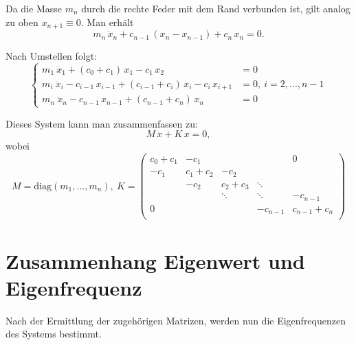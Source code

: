 \documentclass[ngerman,BCOR=4mm]{tudscrreprt}
\theoremstyle{plain} %
\theoremstyle{definition} %
\theoremstyle{remark}
\begin{document}
            Da die Masse $m_n$ durch die rechte Feder mit dem Rand verbunden ist, gilt analog zu oben $x_{n+1} \equiv 0$.
            Man erhält
            $$m_n\,\ddot x_n + c_{n-1}\,(x_n-x_{n-1}) + c_n\,x_n = 0.$$  

            Nach Umstellen folgt:
            \begin{equation}
                  \label{eqn: System GDgl MK 1d}
                  \begin{cases}
                        m_1\ \ddot x_1 + (c_0+c_1)\,x_1 - c_1\,x_2 & = 0   \\
                        m_i\ \ddot x_i - c_{i-1}\,x_{i-1} + (c_{i-1}+c_i)\,x_i -c_i\,x_{i+1} & = 0,\ i=2,...,n-1 \\
                        m_n\ \ddot x_n - c_{n-1}\,x_{n-1} + (c_{n-1}+c_n)\,x_n & = 0
                  \end{cases}
            \end{equation}

            Dieses System kann man zusammenfassen zu:
            $$M\,\ddot x + K\,x = 0,$$
            \renewcommand{\arraystretch}{1.5}
            wobei $$M= \text{diag}(m_1,\dots,m_n),\ 
            K = \begin{pmatrix}
                  c_0+c_1 & -c_1 &  &  & 0 \\
                  -c_1 & c_1+c_2 & -c_2 &  &  \\
                   & -c_2 & c_2+c_3 & \ddots &  \\
                    &  & \ddots & \ddots  & -c_{n-1} \\
                   0&  & & -c_{n-1} & c_{n-1}+c_n \\
                  \end{pmatrix}$$

                  
            \renewcommand{\arraystretch}{1}

            

      \section{Zusammenhang Eigenwert und Eigenfrequenz}
            Nach der Ermittlung der zugehörigen Matrizen, werden nun die Eigenfrequenzen des Systems bestimmt.
\end{document}
